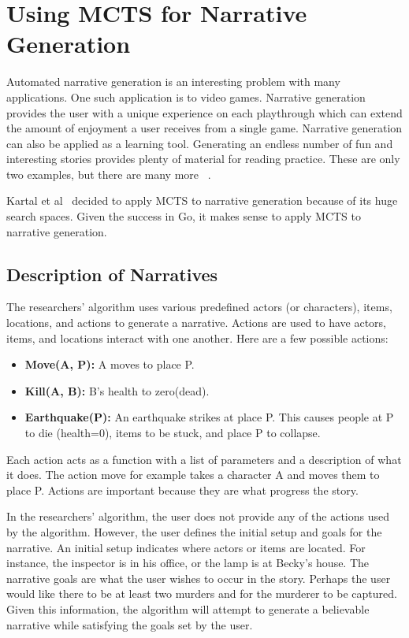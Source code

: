 \documentclass{sig-alternate}
\begin{document}
\section{Using MCTS for Narrative Generation}
Automated narrative generation is an interesting problem with many applications. One such application is to video games. Narrative generation provides the user with a unique experience on each playthrough which can extend the amount of enjoyment a user receives from a single game. Narrative generation can also be applied as a learning tool. Generating an endless number of fun and interesting stories provides plenty of material for reading practice. These are only two examples, but there are many more ~\cite{Narrative}.

Kartal et al~\cite{Narrative} decided to apply MCTS to narrative generation because of its huge search spaces. Given the success in Go, it makes sense to apply MCTS to narrative generation.

\subsection{Description of Narratives}
The researchers' algorithm uses various predefined actors (or characters), items, locations, and actions to generate a narrative. Actions are used to have actors, items, and locations interact with one another. Here are a few possible actions:
\begin{itemize}
\item \textbf{Move(A, P):} A moves to place P.
\item \textbf{Kill(A, B):} B's health to zero(dead).
\item \textbf{Earthquake(P):} An earthquake strikes at place P. This causes people at P to die (health=0), items to be stuck, and place P to collapse.
\end{itemize}
Each action acts as a function with a list of parameters and a description of what it does. The action move for example takes a character A and moves them to place P. Actions are important because they are what progress the story. 

In the researchers' algorithm, the user does not provide any of the actions used by the algorithm. However, the user defines the initial setup and goals for the narrative. An initial setup indicates where actors or items are located. For instance, the inspector is in his office, or the lamp is at Becky's house. The narrative goals are what the user wishes to occur in the story. Perhaps the user would like there to be at least two murders and for the murderer to be captured. Given this information, the algorithm will attempt to generate a believable narrative while satisfying the goals set by the user.
\end{document}
